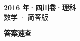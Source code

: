 \documentclass[zihao=-4, a4paper]{ctexart}
\begin{document}
\begin{center}
  {\Large\bfseries 2016 年·四川卷·理科}\\[4pt]
  {\large 数学 · 简答版}
\end{center}
\medskip
{}

\clearpage
{}
\begin{center}{\Large\bfseries 答案速查}\end{center}
\medskip

\end{document}
